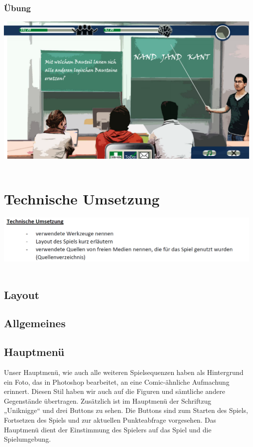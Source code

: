 \documentclass[a4paper, 11pt]{article} %
\begin{document}
\subsubsection{Übung}
\includegraphics[scale=0.5]{images/spiel/uebung.png}\\\\

\section{Technische Umsetzung}
\includegraphics[scale=0.5]{images/umsetzung.png}\\\\
\subsection{Layout}
\subsection{Allgemeines}
\subsection{Hauptmenü}
Unser Hauptmenü, wie auch alle weiteren Spielsequenzen haben als Hintergrund ein Foto, das in Photoshop bearbeitet, an eine Comic-ähnliche Aufmachung erinnert. Diesen Stil haben wir auch auf die Figuren und sämtliche andere Gegenstände übertragen.
Zusätzlich ist im Hauptmenü der Schriftzug „Uniknigge“ und drei Buttons zu sehen. Die Buttons sind zum Starten des Spiels, Fortsetzen des Spiels und zur aktuellen Punkteabfrage vorgesehen. Das Hauptmenü dient der Einstimmung des Spielers auf das Spiel und die Spielumgebung.
\end{document}
